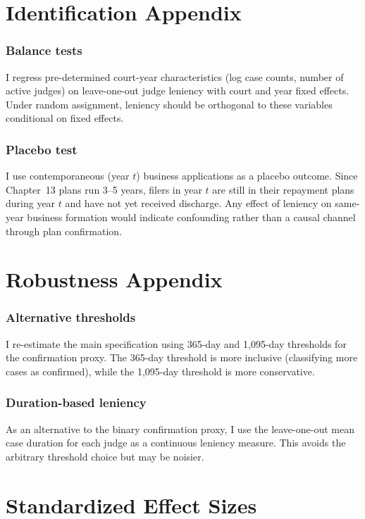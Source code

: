 \documentclass[12pt]{article}
\begin{document}
\section{Identification Appendix}

\subsubsection*{Balance tests} I regress pre-determined court-year characteristics (log case counts, number of active judges) on leave-one-out judge leniency with court and year fixed effects. Under random assignment, leniency should be orthogonal to these variables conditional on fixed effects.

\subsubsection*{Placebo test} I use contemporaneous (year $t$) business applications as a placebo outcome. Since Chapter~13 plans run 3--5 years, filers in year $t$ are still in their repayment plans during year $t$ and have not yet received discharge. Any effect of leniency on same-year business formation would indicate confounding rather than a causal channel through plan confirmation.

\section{Robustness Appendix}

\subsubsection*{Alternative thresholds} I re-estimate the main specification using 365-day and 1,095-day thresholds for the confirmation proxy. The 365-day threshold is more inclusive (classifying more cases as confirmed), while the 1,095-day threshold is more conservative.

\subsubsection*{Duration-based leniency} As an alternative to the binary confirmation proxy, I use the leave-one-out mean case duration for each judge as a continuous leniency measure. This avoids the arbitrary threshold choice but may be noisier.

\section{Standardized Effect Sizes}
\label{sec:sde}


\end{document}
